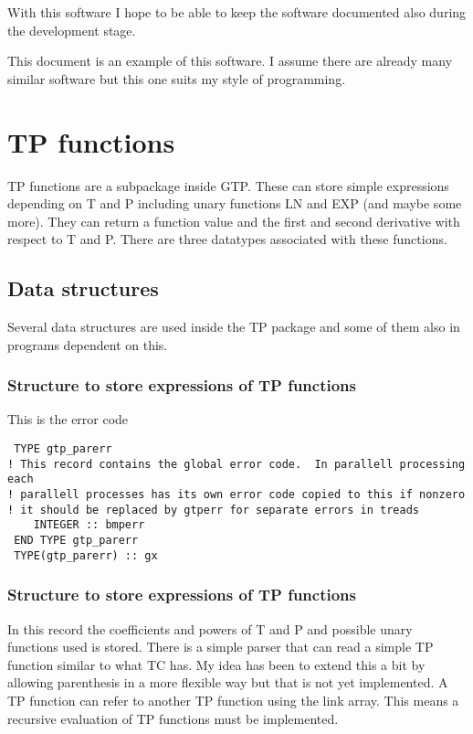 \documentclass[12pt]{article}
\begin{document}
With this software I hope to be able to keep the software documented
also during the development stage.

This document is an example of this software.  I assume there are
already many similar software but this one suits my style of
programming.

\newpage

\tableofcontents

\newpage

\section{TP functions}

TP functions are a subpackage inside GTP.  These can store simple
expressions depending on T and P including unary functions LN and EXP
(and maybe some more).  They can return a function value and the first
and second derivative with respect to T and P.  There are three
datatypes associated with these functions.

\subsection{Data structures}

Several data structures are used inside the TP package and some of
them also in programs dependent on this.

\subsubsection{Structure to store expressions of TP functions}

This is the error code

\begin{verbatim}
 TYPE gtp_parerr
! This record contains the global error code.  In parallell processing each
! parallell processes has its own error code copied to this if nonzero
! it should be replaced by gtperr for separate errors in treads
    INTEGER :: bmperr
 END TYPE gtp_parerr
 TYPE(gtp_parerr) :: gx
\end{verbatim}

\subsubsection{Structure to store expressions of TP functions}

In this record the coefficients and powers of T and P and possible
unary functions used is stored.  There is a simple parser that can
read a simple TP function similar to what TC has.  My idea has been to
extend this a bit by allowing parenthesis in a more flexible way but
that is not yet implemented.  A TP function can refer to another TP
function using the link array.  This means a recursive evaluation of
TP functions must be implemented.
\end{document}
